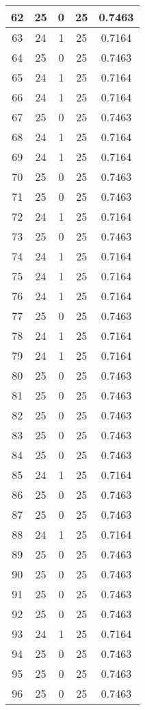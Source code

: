 \documentclass[letterpaper, 12pt]{article}
\begin{document}
\begin{longtable}{|c|c|c|c|c|}
\hline
62 & 25 & 0 & 25 & 0.7463 \\
\hline
63 & 24 & 1 & 25 & 0.7164 \\
\hline
64 & 25 & 0 & 25 & 0.7463 \\
\hline
65 & 24 & 1 & 25 & 0.7164 \\
\hline
66 & 24 & 1 & 25 & 0.7164 \\
\hline
67 & 25 & 0 & 25 & 0.7463 \\
\hline
68 & 24 & 1 & 25 & 0.7164 \\
\hline
69 & 24 & 1 & 25 & 0.7164 \\
\hline
70 & 25 & 0 & 25 & 0.7463 \\
\hline
71 & 25 & 0 & 25 & 0.7463 \\
\hline
72 & 24 & 1 & 25 & 0.7164 \\
\hline
73 & 25 & 0 & 25 & 0.7463 \\
\hline
74 & 24 & 1 & 25 & 0.7164 \\
\hline
75 & 24 & 1 & 25 & 0.7164 \\
\hline
76 & 24 & 1 & 25 & 0.7164 \\
\hline
77 & 25 & 0 & 25 & 0.7463 \\
\hline
78 & 24 & 1 & 25 & 0.7164 \\
\hline
79 & 24 & 1 & 25 & 0.7164 \\
\hline
80 & 25 & 0 & 25 & 0.7463 \\
\hline
81 & 25 & 0 & 25 & 0.7463 \\
\hline
82 & 25 & 0 & 25 & 0.7463 \\
\hline
83 & 25 & 0 & 25 & 0.7463 \\
\hline
84 & 25 & 0 & 25 & 0.7463 \\
\hline
85 & 24 & 1 & 25 & 0.7164 \\
\hline
86 & 25 & 0 & 25 & 0.7463 \\
\hline
87 & 25 & 0 & 25 & 0.7463 \\
\hline
88 & 24 & 1 & 25 & 0.7164 \\
\hline
89 & 25 & 0 & 25 & 0.7463 \\
\hline
90 & 25 & 0 & 25 & 0.7463 \\
\hline
91 & 25 & 0 & 25 & 0.7463 \\
\hline
92 & 25 & 0 & 25 & 0.7463 \\
\hline
93 & 24 & 1 & 25 & 0.7164 \\
\hline
94 & 25 & 0 & 25 & 0.7463 \\
\hline
95 & 25 & 0 & 25 & 0.7463 \\
\hline
96 & 25 & 0 & 25 & 0.7463 \\

\end{longtable}
\end{document}
